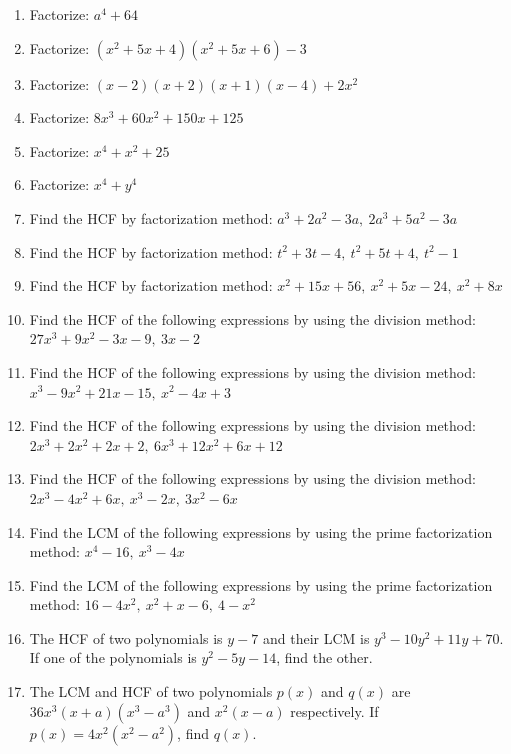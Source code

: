 \documentclass[11pt]{article}
\begin{document}
\begin{enumerate}[leftmargin=1.8cm,start=99]
\item Factorize: $a^4+64$

\item Factorize: $(x^2+5x+4)(x^2+5x+6)-3$

\item Factorize: $(x-2)(x+2)(x+1)(x-4)+2x^2$

\item Factorize: $8x^3+60x^2+150x+125$

\item Factorize: $x^4+x^2+25$

\item Factorize: $x^4+y^4$

\item Find the HCF by factorization method: $a^3+2a^2-3a,\ 2a^3+5a^2-3a$

\item Find the HCF by factorization method: $t^2+3t-4,\ t^2+5t+4,\ t^2-1$

\item Find the HCF by factorization method: $x^2+15x+56,\ x^2+5x-24,\ x^2+8x$

\item Find the HCF of the following expressions by using the division method: $27x^3+9x^2-3x-9,\ 3x-2$

\item Find the HCF of the following expressions by using the division method: $x^3-9x^2+21x-15,\ x^2-4x+3$

\item Find the HCF of the following expressions by using the division method: $2x^3+2x^2+2x+2,\ 6x^3+12x^2+6x+12$

\item Find the HCF of the following expressions by using the division method: $2x^3-4x^2+6x,\ x^3-2x,\ 3x^2-6x$

\item Find the LCM of the following expressions by using the prime factorization method: $x^4-16,\ x^3-4x$

\item Find the LCM of the following expressions by using the prime factorization method: $16-4x^2,\ x^2+x-6,\ 4-x^2$

\item The HCF of two polynomials is $y-7$ and their LCM is $y^3-10y^2+11y+70$. If one of the polynomials is $y^2-5y-14$, find the other.

\item The LCM and HCF of two polynomials $p(x)$ and $q(x)$ are $36x^3(x+a)(x^3-a^3)$ and $x^2(x-a)$ respectively. If $p(x)=4x^2(x^2-a^2)$, find $q(x)$.


\end{enumerate}
\end{document}
